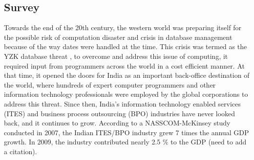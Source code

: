 \subsection{Survey}
 

Towards the end of the 20th century, the western world was preparing itself for the possible risk of computation disaster and crisis in database management because of the way dates were handled at the time. This crisis was termed as the YZK database threat \cite{2001}, to overcome and address this issue of computing, it required input from programmers across the world in a cost efficient manner. At that time, it opened the doors for India as an important back-office destination of the world, where hundreds of expert computer programmers and other information technology professionals were employed by the global corporations to address this threat. Since then, India's information technology enabled services (ITES) and business process outsourcing (BPO) industries  have never looked back, and it continues to grow. According to a NASSCOM-McKinsey study  conducted in 2007, the Indian ITES/BPO industry grew 7 times the annual GDP growth. In 2009, the industry contributed nearly 2.5 \% to the GDP (need to add a citation).

    
    
    
    
    